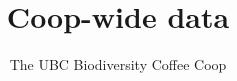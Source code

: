 \documentclass{article}
\title{Coop-wide data}
\author{The UBC Biodiversity Coffee Coop}
\newcommand{\expandUP}[1]{\MakeUppercase{\expand{#1}}}
\begin{document}
\maketitle

\begin{multicols}{2}

\tableofcontents
\end{multicols}

\vspace{8pt}

\setlength{\aboverulesep}{0pt}
\setlength{\belowrulesep}{0pt}
\setlength{\extrarowheight}{.75ex}

\end{document}
